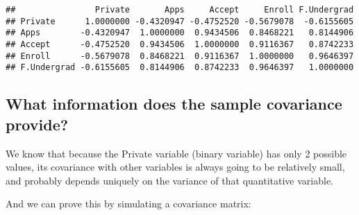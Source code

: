 \documentclass[]{article}
\newenvironment{Shaded}{\begin{snugshade}}{\end{snugshade}}
\newcommand{\ControlFlowTok}[1]{\textcolor[rgb]{0.13,0.29,0.53}{\textbf{#1}}}
\newcommand{\DataTypeTok}[1]{\textcolor[rgb]{0.13,0.29,0.53}{#1}}
\newcommand{\DecValTok}[1]{\textcolor[rgb]{0.00,0.00,0.81}{#1}}
\newcommand{\KeywordTok}[1]{\textcolor[rgb]{0.13,0.29,0.53}{\textbf{#1}}}
\newcommand{\NormalTok}[1]{#1}
\newcommand{\OperatorTok}[1]{\textcolor[rgb]{0.81,0.36,0.00}{\textbf{#1}}}
\newcommand{\StringTok}[1]{\textcolor[rgb]{0.31,0.60,0.02}{#1}}
\begin{document}
\begin{verbatim}
##                Private       Apps     Accept     Enroll F.Undergrad
## Private      1.0000000 -0.4320947 -0.4752520 -0.5679078  -0.6155605
## Apps        -0.4320947  1.0000000  0.9434506  0.8468221   0.8144906
## Accept      -0.4752520  0.9434506  1.0000000  0.9116367   0.8742233
## Enroll      -0.5679078  0.8468221  0.9116367  1.0000000   0.9646397
## F.Undergrad -0.6155605  0.8144906  0.8742233  0.9646397   1.0000000
\end{verbatim}

\hypertarget{what-information-does-the-sample-covariance-provide}{%
\subsection{What information does the sample covariance
provide?}\label{what-information-does-the-sample-covariance-provide}}

We know that because the Private variable (binary variable) has only 2
possible values, its covariance with other variables is always going to
be relatively small, and probably depends uniquely on the variance of
that quantitative variable.

And we can prove this by simulating a covariance matrix:

\begin{Shaded}
\end{Shaded}
\end{document}
